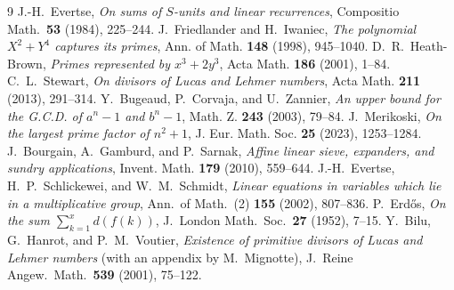\documentclass[11pt]{article}
\theoremstyle{definition}
\begin{document}
\begin{thebibliography}{9}
 J.-H.~Evertse, \emph{On sums of $S$-units and linear recurrences}, Compositio
Math.\ \textbf{53} (1984), 225--244.
 J.~Friedlander and H.~Iwaniec, \emph{The polynomial $X^2+Y^4$ captures its
primes}, Ann. of Math. \textbf{148} (1998), 945--1040.
 D.~R.~Heath-Brown, \emph{Primes represented by $x^3+2y^3$}, Acta Math.
\textbf{186} (2001), 1--84.
 C.~L.~Stewart, \emph{On divisors of Lucas and Lehmer numbers}, Acta Math.
\textbf{211} (2013), 291--314.
 Y.~Bugeaud, P.~Corvaja, and U.~Zannier, \emph{An upper bound for the G.C.D. of
$a^n-1$ and $b^n-1$}, Math. Z. \textbf{243} (2003), 79--84.
 J.~Merikoski, \emph{On the largest prime factor of $n^2+1$}, J. Eur. Math.
Soc. \textbf{25} (2023), 1253--1284.
 J.~Bourgain, A.~Gamburd, and P.~Sarnak, \emph{Affine linear sieve, expanders,
and sundry applications}, Invent. Math. \textbf{179} (2010), 559--644.
 J.-H.~Evertse, H.~P.~Schlickewei, and W.~M.~Schmidt, \emph{Linear equations in
variables which lie in a multiplicative group}, Ann.\ of Math.\ (2) \textbf{155} (2002), 807--836.
 P.~Erd\H{o}s, \emph{On the sum $\sum_{k=1}^x d(f(k))$}, J.\ London Math.\ Soc.\
\textbf{27} (1952), 7--15.
 Y.~Bilu, G.~Hanrot, and P.~M.~Voutier, \emph{Existence of primitive divisors of
Lucas and Lehmer numbers} (with an appendix by M.~Mignotte), J.\ Reine Angew.\ Math.\ \textbf{539}
(2001), 75--122.
\end{thebibliography}
\end{document}
